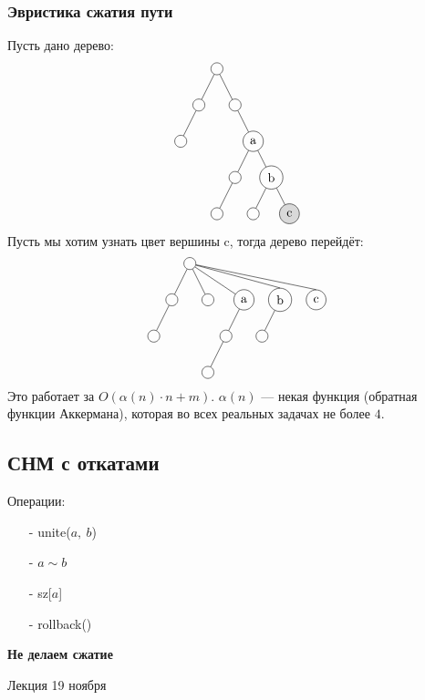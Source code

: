 \documentclass[12pt, a4paper]{article}
\begin{document}
    \subsubsection*{Эвристика сжатия пути}
    Пусть дано дерево:
    \[\begin{tikzpicture}[every circle node/.style={draw}]
        \draw (0, 0) node(0)[circle]{};
        \draw (-0.5, -1) node(1)[circle]{};
        \draw (-1, -2) node(2)[circle]{};
        \draw (0) -- (1);
        \draw (1) -- (2);
        \draw (0.5, -1) node(3)[circle]{};
        \draw (0) -- (3);
        \draw (1, -2) node(4)[circle]{a};
        \draw (0, -4) node(9)[circle]{};
        \draw (3) -- (4);
        \draw (1.5, -3) node(5)[circle]{b};
        \draw(4) -- (5);
        \draw (0.5, -3) node(6)[circle]{};
        \draw (6) -- (9);
        \draw (4) -- (6);
        \draw (1, -4) node(7)[circle]{};
        \draw (2, -4) node(8)[circle, fill=gray!30]{c};
        \draw (5) -- (7);
        \draw (5) -- (8);
    \end{tikzpicture}\]
    Пусть мы хотим узнать цвет вершины c, тогда дерево перейдёт:
    \[\begin{tikzpicture}[every circle node/.style={draw}]
        \draw (0, 0) node(0)[circle]{};
        \draw (-0.5, -1) node(1)[circle]{};
        \draw (-1, -2) node(2)[circle]{};
        \draw (0) -- (1);
        \draw (1) -- (2);
        \draw (0.5, -1) node(3)[circle]{};
        \draw (0) -- (3);
        \draw (1.5, -1) node(4)[circle]{a};
        \draw (0.5, -3) node(9)[circle]{};
        \draw (0) -- (4);
        \draw (2.5, -1) node(5)[circle]{b};
        \draw (0) to[] (5.north);
        \draw (1, -2) node(6)[circle]{};
        \draw (4) -- (6);
        \draw (6) -- (9);
        \draw (2, -2) node(7)[circle]{};
        \draw (3.5, -1) node(8)[circle]{c};
        \draw (5) -- (7);
        \draw (0) to[] (8.north);
    \end{tikzpicture}\]
    Это  работает за $O(\alpha(n)\cdot n + m)$. $\alpha(n)$ --- некая функция (обратная функции Аккермана), которая во всех реальных задачах не более $4$.
    \subsection*{СНМ с откатами}
    Операции:
    \begin{itemize}
        \item[-] unite($a,\ b$)
        \item[-] $a\sim b$
        \item[-] sz[$a$]
        \item[-] rollback()
    \end{itemize}
    \textbf{Не делаем сжатие}
    \begin{center}
        Лекция 19 ноября
    \end{center}
\end{document}
